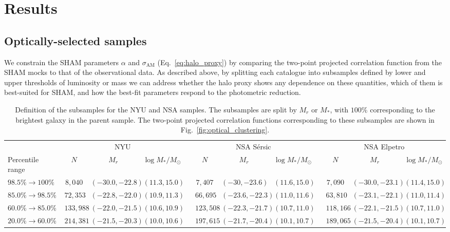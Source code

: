 \documentclass[usenatbib,useAMS]{mnras}
\newcommand{\scatter}{\ensuremath{\sigma_{\mathrm{AM}}}}
\begin{document}
\section{Results}\label{sec:results}

\subsection{Optically-selected samples}

We constrain the \ac{SHAM} parameters $\alpha$ and $\scatter$ (Eq.~\ref{eq:halo_proxy}) by comparing the two-point projected correlation function from the \ac{SHAM} mocks to that of the observational data. As described above, by splitting each catalogue into subsamples defined by lower and upper thresholds of luminosity or mass we can address whether the halo proxy shows any dependence on these quantities, which of them is best-suited for \ac{SHAM}, and how the best-fit parameters respond to the photometric reduction.

\begin{table}
\setlength{\tabcolsep}{3pt}
\renewcommand{\arraystretch}{1.25}
\begin{tabular}{llccccccccccc}
                            &   & \multicolumn{3}{c}{NYU}                         &  & \multicolumn{3}{c}{NSA S\'ersic}                  &  & \multicolumn{3}{c}{NSA Elpetro}                 \\ \cline{3-5} \cline{7-9} \cline{11-13} 
Percentile range            &   & $N$       & $M_r$      & $\log M_*/M_\odot$ &  & $N$       & $M_r$      & $\log M_*/M_\odot$ &  & $N$       & $M_r$      & $\log M_*/M_\odot$ \\ \cline{1-1} \cline{3-5} \cline{7-9} \cline{11-13} 
$98.5\% \rightarrow 100\%$ & & $8,040$   & $(-30.0, -22.8)$ & $(11.3, 15.0)$   &  & $7,407$   & $(-30, -23.6)$ & $(11.6, 15.0)$   &  & $7,090$   & $(-30.0, -23.1)$ & $(11.4, 15.0)$  \\
$85.0\% \rightarrow 98.5\%$  & & $72,353$  & $(-22.8, -22.0)$ & $(10.9, 11.3)$   &  & $66,695$  & $(-23.6, -22.3)$ & $(11.0, 11.6)$   &  & $63,810$   & $(-23.1, -22.1)$ & $(11.0, 11.4)$   \\
$60.0\% \rightarrow 85.0\%$  & & $133,988$ & $(-22.0, -21.5)$ & $(10.6, 10.9)$   &  & $123,508$ & $(-22.3, -21.7)$ & $(10.7, 11.0)$   &  & $118,166$   & $(-22.1, -21.5)$ & $(10.7, 11.0)$   \\
$20.0\% \rightarrow 60.0\%$  & & $214,381$ & $(-21.5, -20.3)$ & $(10.0, 10.6)$    &  & $197,615$ & $(-21.7, -20.4)$ & $(10.1, 10.7)$    &  & $189,065$  & $(-21.5, -20.4)$ & $(10.1, 10.7)$   \\ \cline{1-1} \cline{3-5} \cline{7-9} \cline{11-13}
\end{tabular}
\caption{\label{tab:galaxy_counts}Definition of the subsamples for the \ac{NYU} and \ac{NSA} samples. The subsamples are split by $M_r$ or $M_*$, with $100\%$ corresponding to the brightest galaxy in the parent sample. The two-point projected correlation functions corresponding to these subsamples are shown in Fig.~\ref{fig:optical_clustering}.}
\end{table}
\end{document}
